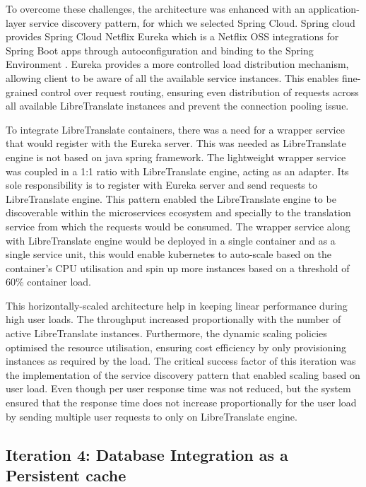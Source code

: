To overcome these challenges, the architecture was enhanced with an application-layer service discovery pattern, for which we selected Spring Cloud. Spring cloud provides Spring Cloud Netflix Eureka which is a Netflix OSS integrations for Spring Boot apps through autoconfiguration and binding to the Spring Environment \cite{spring_cloud_netflix,carnell2021spring,netflix_eureka}. Eureka provides a more controlled load distribution mechanism, allowing client to be aware of all the available service instances. This enables fine-grained control over request routing, ensuring even distribution of requests across all available LibreTranslate instances and prevent the connection pooling issue.

To integrate LibreTranslate containers, there was a need for a wrapper service that would register with the Eureka server. This was needed as LibreTranslate engine is not based on java spring framework. The lightweight wrapper service was coupled in a 1:1 ratio with LibreTranslate engine, acting as an adapter. Its sole responsibility is to register with Eureka server and send requests to LibreTranslate engine. This pattern enabled the LibreTranslate engine to be discoverable within the microservices ecosystem and specially to the translation service from which the requests would be consumed. The wrapper service along with LibreTranslate engine would be deployed in a single container and as a single service unit, this would enable kubernetes to auto-scale based on the container's CPU utilisation and spin up more instances based on a threshold of 60\% container load\cite{kubernetes_horizontal_pod_autoscaling}.

This horizontally-scaled architecture help in keeping linear performance during high user loads. The throughput increased proportionally with the number of active LibreTranslate instances. Furthermore, the dynamic scaling policies optimised the resource utilisation, ensuring cost efficiency by only provisioning instances as required by the load. The critical success factor of this iteration was the implementation of the service discovery pattern that enabled scaling based on user load. Even though per user response time was not reduced, but the system ensured that the response time does not increase proportionally for the user load by sending multiple user requests to only on LibreTranslate engine.

\subsection{Iteration 4: Database Integration as a Persistent cache}

